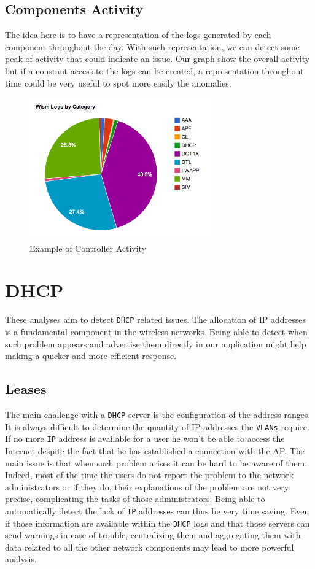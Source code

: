 \subsection{Components Activity}
The idea here is to have a representation of the logs generated by each component throughout the day. With such representation, we can detect some peak of activity that could indicate an issue. Our graph show the overall activity but if a constant access to the logs can be created, a representation throughout time could be very useful to spot more easily the anomalies.

\begin{figure}[H]
	\centering
   \includegraphics[width=0.7\textwidth]{Pictures/chapter5/controller.png}
   \caption{Example of Controller Activity}
\end{figure}

\section{DHCP}
These analyses aim to detect \texttt{DHCP} related issues. The allocation of IP addresses is a fundamental component in the wireless networks. Being able to detect when such problem appears and advertise them directly in our application might help making a quicker and more efficient response.

\subsection{Leases}
The main challenge with a \texttt{DHCP} server is the configuration of the address ranges. It is always difficult to determine the quantity of IP addresses the \texttt{VLANs} require. If no more \texttt{IP} address is available for a user he won't be able to access the Internet despite the fact that he has established a connection with the AP. The main issue is that when such problem arises it can be hard to be aware of them. Indeed, most of the time the users do not report the problem to the network administrators or if they do, their explanations of the problem are not very precise, complicating the tasks of those administrators. Being able to automatically detect the lack of \texttt{IP} addresses can thus be very time saving. Even if those information are available within the \texttt{DHCP} logs and that those servers can send warnings in case of trouble, centralizing them and aggregating them with data related to all the other network components may lead to more powerful analysis.

